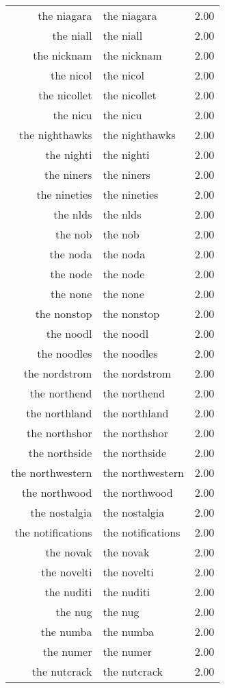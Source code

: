 \begin{table}[ht]
\begin{tabular}{rlr}
  the niagara & the niagara & 2.00 \\ 
  the niall & the niall & 2.00 \\ 
  the nicknam & the nicknam & 2.00 \\ 
  the nicol & the nicol & 2.00 \\ 
  the nicollet & the nicollet & 2.00 \\ 
  the nicu & the nicu & 2.00 \\ 
  the nighthawks & the nighthawks & 2.00 \\ 
  the nighti & the nighti & 2.00 \\ 
  the niners & the niners & 2.00 \\ 
  the nineties & the nineties & 2.00 \\ 
  the nlds & the nlds & 2.00 \\ 
  the nob & the nob & 2.00 \\ 
  the noda & the noda & 2.00 \\ 
  the node & the node & 2.00 \\ 
  the none & the none & 2.00 \\ 
  the nonstop & the nonstop & 2.00 \\ 
  the noodl & the noodl & 2.00 \\ 
  the noodles & the noodles & 2.00 \\ 
  the nordstrom & the nordstrom & 2.00 \\ 
  the northend & the northend & 2.00 \\ 
  the northland & the northland & 2.00 \\ 
  the northshor & the northshor & 2.00 \\ 
  the northside & the northside & 2.00 \\ 
  the northwestern & the northwestern & 2.00 \\ 
  the northwood & the northwood & 2.00 \\ 
  the nostalgia & the nostalgia & 2.00 \\ 
  the notifications & the notifications & 2.00 \\ 
  the novak & the novak & 2.00 \\ 
  the novelti & the novelti & 2.00 \\ 
  the nuditi & the nuditi & 2.00 \\ 
  the nug & the nug & 2.00 \\ 
  the numba & the numba & 2.00 \\ 
  the numer & the numer & 2.00 \\ 
  the nutcrack & the nutcrack & 2.00 \\ 

\end{tabular}
\end{table}
